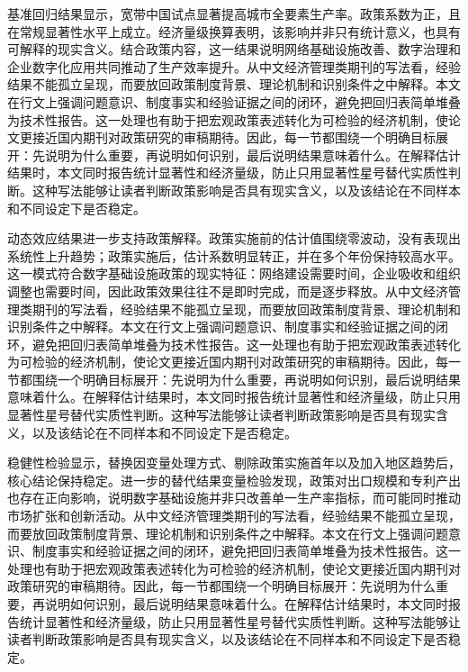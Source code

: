 \documentclass[12pt,a4paper]{article}
\begin{document}
基准回归结果显示，宽带中国试点显著提高城市全要素生产率。政策系数为正，且在常规显著性水平上成立。经济量级换算表明，该影响并非只有统计意义，也具有可解释的现实含义。结合政策内容，这一结果说明网络基础设施改善、数字治理和企业数字化应用共同推动了生产效率提升。从中文经济管理类期刊的写法看，经验结果不能孤立呈现，而要放回政策制度背景、理论机制和识别条件之中解释。本文在行文上强调问题意识、制度事实和经验证据之间的闭环，避免把回归表简单堆叠为技术性报告。这一处理也有助于把宏观政策表述转化为可检验的经济机制，使论文更接近国内期刊对政策研究的审稿期待。因此，每一节都围绕一个明确目标展开：先说明为什么重要，再说明如何识别，最后说明结果意味着什么。在解释估计结果时，本文同时报告统计显著性和经济量级，防止只用显著性星号替代实质性判断。这种写法能够让读者判断政策影响是否具有现实含义，以及该结论在不同样本和不同设定下是否稳定。

动态效应结果进一步支持政策解释。政策实施前的估计值围绕零波动，没有表现出系统性上升趋势；政策实施后，估计系数明显转正，并在多个年份保持较高水平。这一模式符合数字基础设施政策的现实特征：网络建设需要时间，企业吸收和组织调整也需要时间，因此政策效果往往不是即时完成，而是逐步释放。从中文经济管理类期刊的写法看，经验结果不能孤立呈现，而要放回政策制度背景、理论机制和识别条件之中解释。本文在行文上强调问题意识、制度事实和经验证据之间的闭环，避免把回归表简单堆叠为技术性报告。这一处理也有助于把宏观政策表述转化为可检验的经济机制，使论文更接近国内期刊对政策研究的审稿期待。因此，每一节都围绕一个明确目标展开：先说明为什么重要，再说明如何识别，最后说明结果意味着什么。在解释估计结果时，本文同时报告统计显著性和经济量级，防止只用显著性星号替代实质性判断。这种写法能够让读者判断政策影响是否具有现实含义，以及该结论在不同样本和不同设定下是否稳定。

稳健性检验显示，替换因变量处理方式、剔除政策实施首年以及加入地区趋势后，核心结论保持稳定。进一步的替代结果变量检验发现，政策对出口规模和专利产出也存在正向影响，说明数字基础设施并非只改善单一生产率指标，而可能同时推动市场扩张和创新活动。从中文经济管理类期刊的写法看，经验结果不能孤立呈现，而要放回政策制度背景、理论机制和识别条件之中解释。本文在行文上强调问题意识、制度事实和经验证据之间的闭环，避免把回归表简单堆叠为技术性报告。这一处理也有助于把宏观政策表述转化为可检验的经济机制，使论文更接近国内期刊对政策研究的审稿期待。因此，每一节都围绕一个明确目标展开：先说明为什么重要，再说明如何识别，最后说明结果意味着什么。在解释估计结果时，本文同时报告统计显著性和经济量级，防止只用显著性星号替代实质性判断。这种写法能够让读者判断政策影响是否具有现实含义，以及该结论在不同样本和不同设定下是否稳定。
\end{document}
